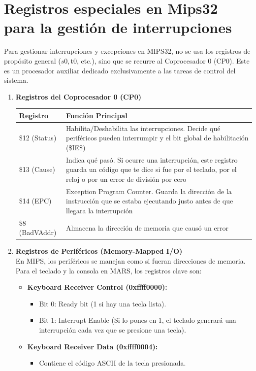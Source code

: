 \documentclass[]{article}
\begin{document}
\section{Registros especiales en Mips32 para la gestión de interrupciones}
	Para gestionar interrupciones y excepciones en MIPS32, no se usa los registros de propósito general ($s0, $t0, etc.), sino que se recurre al Coprocesador 0 (CP0). Este es un procesador auxiliar dedicado exclusivamente a las tareas de control del sistema.
	\begin{enumerate}
		\item \textbf{Registros del Coprocesador 0 (CP0)}\\
			\begin{tabular}{|>{\centering\arraybackslash}m{3cm}|>{\centering\arraybackslash}m{7cm}|}
				\hline
				Registro & Función Principal \\
				\hline
				\$12 (Status) & Habilita/Deshabilita las interrupciones. Decide qué periféricos pueden interrumpir y el bit global de habilitación (\$IE\$) \\
				\hline
				\$13 (Cause) & Indica qué pasó. Si ocurre una interrupción, este registro guarda un código que te dice si fue por el teclado, por el reloj o por un error de división por cero \\
				\hline
				\$14 (EPC) & Exception Program Counter. Guarda la dirección de la instrucción que se estaba ejecutando justo antes de que llegara la interrupción \\
				\hline
				\$8 (BadVAddr) & Almacena la dirección de memoria que causó un error \\
				\hline
			\end{tabular}
		\item \textbf{Registros de Periféricos (Memory-Mapped I/O)}\\
			En MIPS, los periféricos se manejan como si fueran direcciones de memoria. Para el teclado y la consola en MARS, los registros clave son:
			\begin{itemize}
				\item \textbf{Keyboard Receiver Control (0xffff0000):}\\
					\begin{itemize}
						\item Bit 0: Ready bit (1 si hay una tecla lista).
						\item Bit 1: Interrupt Enable (Si lo pones en 1, el teclado generará una interrupción cada vez que se presione una tecla).
					\end{itemize}
				\item \textbf{Keyboard Receiver Data (0xffff0004):}\\
					\begin{itemize}
						\item Contiene el código ASCII de la tecla presionada.
					\end{itemize}
			\end{itemize}
	\end{enumerate}
	
\end{document}
